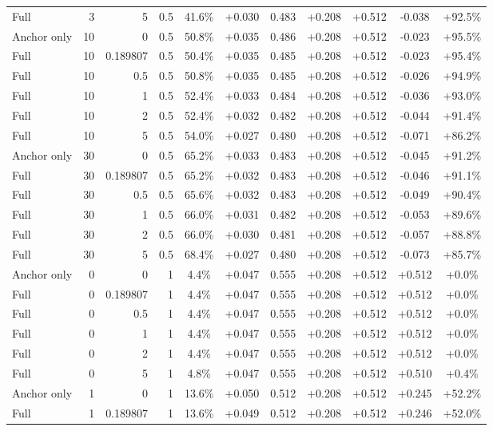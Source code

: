 \begin{table}[htbp]
\begin{tabular}{lrrrccccccc}
Full & 3 & 5 & 0.5 & 41.6\% & +0.030 & 0.483 & +0.208 & +0.512 & -0.038 & +92.5\% \\
Anchor only & 10 & 0 & 0.5 & 50.8\% & +0.035 & 0.486 & +0.208 & +0.512 & -0.023 & +95.5\% \\
Full & 10 & 0.189807 & 0.5 & 50.4\% & +0.035 & 0.485 & +0.208 & +0.512 & -0.023 & +95.4\% \\
Full & 10 & 0.5 & 0.5 & 50.8\% & +0.035 & 0.485 & +0.208 & +0.512 & -0.026 & +94.9\% \\
Full & 10 & 1 & 0.5 & 52.4\% & +0.033 & 0.484 & +0.208 & +0.512 & -0.036 & +93.0\% \\
Full & 10 & 2 & 0.5 & 52.4\% & +0.032 & 0.482 & +0.208 & +0.512 & -0.044 & +91.4\% \\
Full & 10 & 5 & 0.5 & 54.0\% & +0.027 & 0.480 & +0.208 & +0.512 & -0.071 & +86.2\% \\
Anchor only & 30 & 0 & 0.5 & 65.2\% & +0.033 & 0.483 & +0.208 & +0.512 & -0.045 & +91.2\% \\
Full & 30 & 0.189807 & 0.5 & 65.2\% & +0.032 & 0.483 & +0.208 & +0.512 & -0.046 & +91.1\% \\
Full & 30 & 0.5 & 0.5 & 65.6\% & +0.032 & 0.483 & +0.208 & +0.512 & -0.049 & +90.4\% \\
Full & 30 & 1 & 0.5 & 66.0\% & +0.031 & 0.482 & +0.208 & +0.512 & -0.053 & +89.6\% \\
Full & 30 & 2 & 0.5 & 66.0\% & +0.030 & 0.481 & +0.208 & +0.512 & -0.057 & +88.8\% \\
Full & 30 & 5 & 0.5 & 68.4\% & +0.027 & 0.480 & +0.208 & +0.512 & -0.073 & +85.7\% \\
Anchor only & 0 & 0 & 1 & 4.4\% & +0.047 & 0.555 & +0.208 & +0.512 & +0.512 & +0.0\% \\
Full & 0 & 0.189807 & 1 & 4.4\% & +0.047 & 0.555 & +0.208 & +0.512 & +0.512 & +0.0\% \\
Full & 0 & 0.5 & 1 & 4.4\% & +0.047 & 0.555 & +0.208 & +0.512 & +0.512 & +0.0\% \\
Full & 0 & 1 & 1 & 4.4\% & +0.047 & 0.555 & +0.208 & +0.512 & +0.512 & +0.0\% \\
Full & 0 & 2 & 1 & 4.4\% & +0.047 & 0.555 & +0.208 & +0.512 & +0.512 & +0.0\% \\
Full & 0 & 5 & 1 & 4.8\% & +0.047 & 0.555 & +0.208 & +0.512 & +0.510 & +0.4\% \\
Anchor only & 1 & 0 & 1 & 13.6\% & +0.050 & 0.512 & +0.208 & +0.512 & +0.245 & +52.2\% \\
Full & 1 & 0.189807 & 1 & 13.6\% & +0.049 & 0.512 & +0.208 & +0.512 & +0.246 & +52.0\% \\

\end{tabular}
\end{table}
